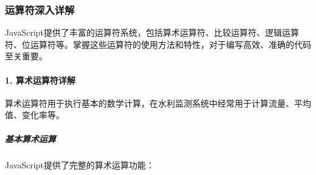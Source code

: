 \begin{Shaded}
\begin{Highlighting}[]
    \NormalTok{ \{}
        \OperatorTok{:} \OperatorTok{===} \OperatorTok{,}
\OperatorTok{,}
        \OperatorTok{:} \OperatorTok{===}  \NormalTok{ \{ }\OperatorTok{,}\OperatorTok{:} 
\NormalTok{    \}}\OperatorTok{;}
\NormalTok{\}}

\NormalTok{(}\NormalTok{(}\NormalTok{))}\OperatorTok{;}  

\NormalTok{(}\NormalTok{(}\NormalTok{))}\OperatorTok{;} 
\end{Highlighting}
\end{Shaded}

\subsubsection{运算符深入详解}\label{ux8fd0ux7b97ux7b26ux6df1ux5165ux8be6ux89e3}

JavaScript提供了丰富的运算符系统，包括算术运算符、比较运算符、逻辑运算符、位运算符等。掌握这些运算符的使用方法和特性，对于编写高效、准确的代码至关重要。

\paragraph{1. 算术运算符详解}\label{ux7b97ux672fux8fd0ux7b97ux7b26ux8be6ux89e3}

算术运算符用于执行基本的数学计算，在水利监测系统中经常用于计算流量、平均值、变化率等。

\subparagraph{基本算术运算}\label{ux57faux672cux7b97ux672fux8fd0ux7b97}

JavaScript提供了完整的算术运算功能：

